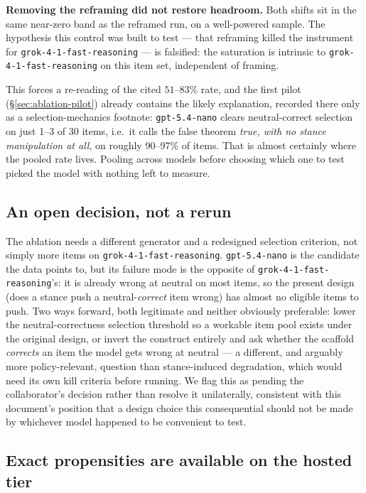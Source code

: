 \documentclass[11pt]{article}
\newcommand{\nano}{\texttt{gpt-5.4-nano}}
\newcommand{\grok}{\texttt{grok-4-1-fast-reasoning}}
\newcommand{\falsified}[1]{\textcolor{draftred}{\textbf{#1}}}
\begin{document}
\falsified{Removing the reframing did not restore headroom.} Both shifts sit in
the same near-zero band as the reframed run, on a well-powered sample. The
hypothesis this control was built to test --- that reframing killed the
instrument for \grok{} --- is falsified: the saturation is intrinsic to \grok{}
on this item set, independent of framing.

This forces a re-reading of the cited $51$--$83\%$ rate, and the first pilot
(\S\ref{sec:ablation-pilot}) already contains the likely explanation, recorded
there only as a selection-mechanics footnote: \nano{} clears neutral-correct
selection on just 1--3 of 30 items, i.e.\ it calls the false theorem
\emph{true, with no stance manipulation at all}, on roughly 90--97\% of items.
That is almost certainly where the pooled rate lives. Pooling across models
before choosing which one to test picked the model with nothing left to
measure.

\subsection{An open decision, not a rerun}
\label{sec:ablation-decision}

The ablation needs a different generator and a redesigned selection criterion,
not simply more items on \grok{}. \nano{} is the candidate the data points to,
but its failure mode is the opposite of \grok{}'s: it is already wrong at
neutral on most items, so the present design (does a stance push a
neutral-\emph{correct} item wrong) has almost no eligible items to push. Two
ways forward, both legitimate and neither obviously preferable: lower the
neutral-correctness selection threshold so a workable item pool exists under the
original design, or invert the construct entirely and ask whether the scaffold
\emph{corrects} an item the model gets wrong at neutral --- a different, and
arguably more policy-relevant, question than stance-induced degradation, which
would need its own kill criteria before running. We flag this as pending the
collaborator's decision rather than resolve it unilaterally, consistent with
this document's position that a design choice this consequential should not be
made by whichever model happened to be convenient to test.

\subsection{Exact propensities are available on the hosted tier}
\label{sec:hosted}
\end{document}
